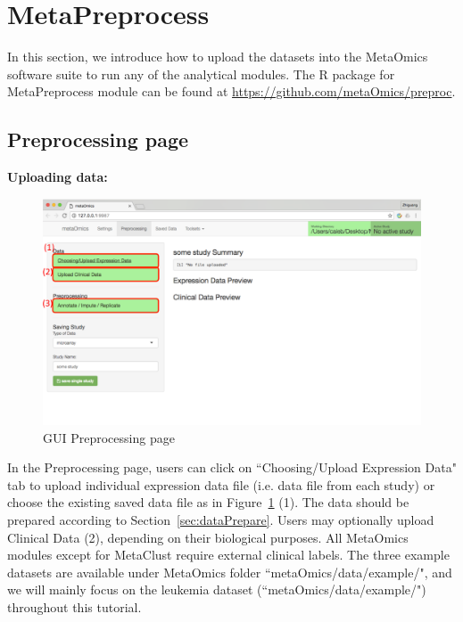 

\section{MetaPreprocess}

In this section, we introduce how to upload the datasets into the MetaOmics software suite to run any of the analytical modules.
The R package for MetaPreprocess module can be found at \url{https://github.com/metaOmics/preproc}.

\subsection{Preprocessing page}
\label{sec:procedure}

\begin{steps}
\item \textbf{Uploading data:}

\begin{figure}[!htbp]
\begin{center}
\includegraphics[scale=0.7]{./figure/preprocessing/GUIpreprocessing}
\caption{GUI Preprocessing page}
\label{fig:GUIpreprocessing}
\end{center}
\end{figure}

In the Preprocessing page,
users can click on ``Choosing/Upload Expression Data" tab to upload individual expression data file (i.e. data file from each study) or choose the existing saved data file as in Figure~\ref{fig:GUIpreprocessing} {\color{red} (1)}.
The data should be prepared according to Section~\ref{sec:dataPrepare}.
Users may optionally upload Clinical Data {\color{red} (2)}, depending on their biological purposes.
All MetaOmics modules except for MetaClust require external clinical labels.
The three example datasets are available under MetaOmics folder ``metaOmics/data/example/",
and we will mainly focus on the leukemia dataset (``metaOmics/data/example/") throughout this tutorial.


\end{steps}
